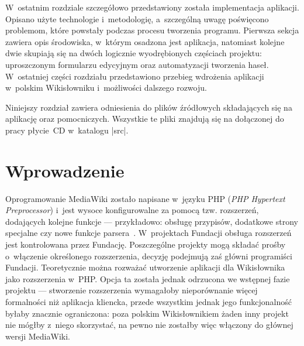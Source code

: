 \label{chap:impl}
W~ostatnim rozdziale szczegółowo przedstawiony została implementacja aplikacji. Opisano użyte technologie i~metodologię, a~szczególną uwagę poświęcono problemom, które powstały podczas procesu tworzenia programu. Pierwsza sekcja zawiera opis środowiska, w~którym osadzona jest aplikacja, natomiast kolejne dwie skupiają się na dwóch logicznie wyodrębionych częściach projektu: uproszczonym formularzu edycyjnym oraz automatyzacji tworzenia haseł. W~ostatniej części rozdziału przedstawiono przebieg wdrożenia aplikacji w~polskim Wikisłowniku i~możliwości dalszego rozwoju.

Niniejszy rozdział zawiera odniesienia do plików źródłowych składających się na aplikację oraz pomocniczych. Wszystkie te pliki znajdują się na dołączonej do pracy płycie~CD w~katalogu \kod|src|.

\section{Wprowadzenie}
Oprogramowanie MediaWiki zostało napisane w~języku PHP (\emph{PHP Hypertext Preprocessor}) i~jest wysoce konfigurowalne za pomocą tzw. rozszerzeń, dodających kolejne funkcje --- przykładowo: obsługę przypisów, dodatkowe strony specjalne czy nowe funkcje parsera~\cite{mw:extensions}. W~projektach Fundacji obsługa rozszerzeń jest kontrolowana przez Fundację. Poszczególne projekty mogą składać prośby o~włączenie określonego rozszerzenia, decyzję podejmują zaś główni programiści Fundacji. Teoretycznie można rozważać utworzenie aplikacji dla Wikisłownika jako rozszerzenia w~PHP. Opcja ta została jednak odrzucona we wstępnej fazie projektu --- stworzenie rozszerzenia wymagałoby nieporównanie więcej formalności niż aplikacja kliencka, przede wszystkim jednak jego funkcjonalność byłaby znacznie ograniczona: poza polskim Wikisłownikiem żaden inny projekt nie mógłby z~niego skorzystać, na pewno nie zostałby więc włączony do głównej wersji MediaWiki.

